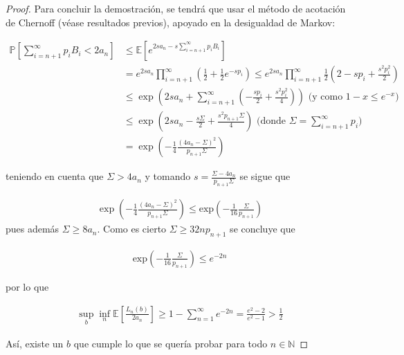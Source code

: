 \begin{proof}
Para concluir la demostración, se tendrá que usar el método de acotación de Chernoff (véase resultados previos), apoyado en la desigualdad de Markov:

\begin{align*}
\mathbb{P}\left[ \sum_{i=n+1}^{\infty} p_iB_i < 2a_n \right] &\leq \mathbb{E}\left[ e^{2sa_n - s\sum_{i=n+1}^{\infty} p_iB_i} \right] \\ 
&= e^{2sa_n}\prod_{i=n+1}^{\infty}\left(\frac{1}{2} + \frac{1}{2}e^{-sp_i}\right) \leq e^{2sa_n}\prod_{i=n+1}^{\infty}\frac{1}{2}\left(2-sp_i+\frac{s^2p_i^2}{2}\right) \\
&\leq \exp\left(2sa_n + \sum_{i=n+1}^{\infty}\left(-\frac{sp_i}{2}+\frac{s^2p_i^2}{4}\right)\right) \text{ (y como } 1-x \leq e^{-x} \text{)} \\
& \leq \exp\left( 2sa_n - \frac{s\Sigma}{2} + \frac{s^2p_{n+1}\Sigma}{4}\right) \text{ (donde } \Sigma = \sum_{i=n+1}^{\infty} p_i  \text{)} \\
&= \exp\left(-\frac{1}{4} \frac{(4a_n - \Sigma)^2}{p_{n+1}\Sigma} \right)
\end{align*}

teniendo en cuenta que $\Sigma > 4a_n $ y tomando $s = \frac{\Sigma - 4a_n}{p_{n+1}\Sigma}$ se sigue que 

\begin{align*}
\exp\left(-\frac{1}{4} \frac{(4a_n - \Sigma)^2}{p_{n+1}\Sigma} \right) \leq \text{exp}\left( -\frac{1}{16} \frac{\Sigma}{p_{n+1}} \right)
\end{align*}
pues además $\Sigma \geq 8a_n$. Como es cierto $\Sigma \geq 32np_{n+1}$ se concluye que

\begin{align*}
\text{exp}\left( -\frac{1}{16} \frac{\Sigma}{p_{n+1}} \right) \leq e^{-2n}
\end{align*}

por lo que

\begin{align*}
\sup_{b}\inf_{n} \mathbb{E} \left[ \frac{L_n(b)}{2a_n} \right] \geq 1 - \sum_{n=1}^{\infty} e^{-2n} = \frac{e^2-2}{e^2-1} > \frac{1}{2}
\end{align*}

Así, existe un $b$ que cumple lo que se quería probar para todo $n \in \mathbb{N}$

\end{proof}


